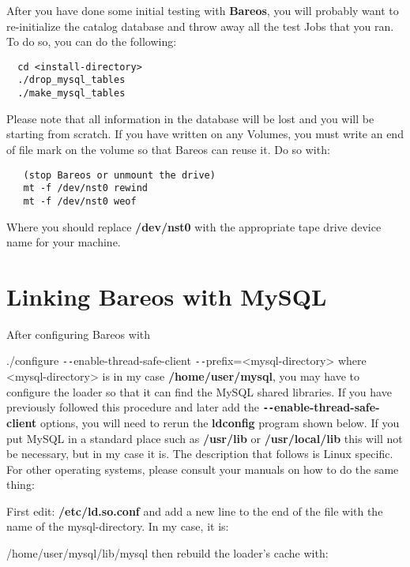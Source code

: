 After you have done some initial testing with {\bf Bareos}, you will probably
want to re-initialize the catalog database and throw away all the test Jobs
that you ran. To do so, you can do the following:

\footnotesize
\begin{verbatim}
  cd <install-directory>
  ./drop_mysql_tables
  ./make_mysql_tables
\end{verbatim}
\normalsize

Please note that all information in the database will be lost and you will be
starting from scratch. If you have written on any Volumes, you must write an
end of file mark on the volume so that Bareos can reuse it. Do so with:

\footnotesize
\begin{verbatim}
   (stop Bareos or unmount the drive)
   mt -f /dev/nst0 rewind
   mt -f /dev/nst0 weof
\end{verbatim}
\normalsize

Where you should replace {\bf /dev/nst0} with the appropriate tape drive
device name for your machine.

\section{Linking Bareos with MySQL}

After configuring Bareos with

./configure \verb:--:enable-thread-safe-client \verb:--:prefix={\textless}mysql-directory{\textgreater}
where {\textless}mysql-directory{\textgreater} is in my case {\bf /home/user/mysql}, you may
have to configure the loader so that it can find the MySQL shared libraries.
If you have previously followed this procedure and later add the {\bf
\verb:--:enable-thread-safe-client} options, you will need to rerun the {\bf
ldconfig} program shown below. If you put MySQL in a standard place such as
{\bf /usr/lib} or {\bf /usr/local/lib} this will not be necessary, but in my
case it is. The description that follows is Linux specific. For other
operating systems, please consult your manuals on how to do the same thing:

First edit: {\bf /etc/ld.so.conf} and add a new line to the end of the file
with the name of the mysql-directory. In my case, it is:

/home/user/mysql/lib/mysql then rebuild the loader's cache with:

